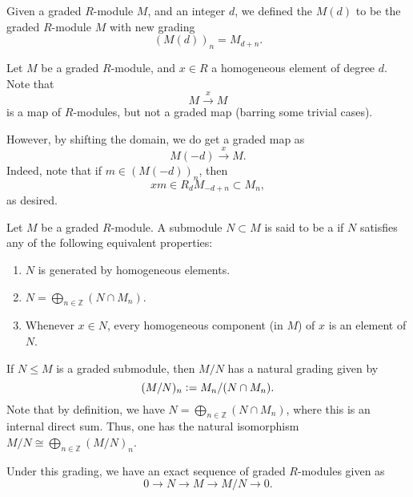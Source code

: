 \documentclass[12pt]{article}
\begin{document}
\begin{defn}
	Given a graded $R$-module $M$, and an integer $d$, we defined the  $M(d)$ to be the graded $R$-module $M$ with new grading
	\begin{equation*} 
		(M(d))_{n} = M_{d + n}.
	\end{equation*}
\end{defn}

\begin{obs}
	Let $M$ be a graded $R$-module, and $x \in R$ a homogeneous element of degree $d$. Note that 
	\begin{equation*} 
		M \xrightarrow{x} M
	\end{equation*}
	is a map of $R$-modules, but not a graded map (barring some trivial cases). 

	However, by shifting the domain, we do get a graded map as
	\begin{equation*} 
		M(-d) \xrightarrow{x} M.
	\end{equation*}
	Indeed, note that if $m \in (M(-d))_{n}$, then
	\begin{equation*} 
		xm \in R_{d}M_{-d + n} \subset M_{n},
	\end{equation*}
	as desired.
\end{obs}

\begin{defn}
	Let $M$ be a graded $R$-module. A submodule $N \subset M$ is said to be a  if $N$ satisfies any of the following equivalent properties:
	\begin{enumerate}
		\item $N$ is generated by homogeneous elements.
		\item $N = \bigoplus_{n \in \mathbb{Z}} (N \cap M_{n})$.
		\item Whenever $x \in N$, every homogeneous component (in $M$) of $x$ is an element of $N$.
	\end{enumerate}
\end{defn}

\begin{obs}
	If $N \le M$ is a graded submodule, then $M/N$ has a natural grading given by
	\begin{equation*} 
		(M/N)_{n} \vcentcolon= M_{n}/(N \cap M_{n}).
	\end{equation*}
	Note that by definition, we have $N = \bigoplus_{n \in \mathbb{Z}} (N \cap M_{n})$, where this is an internal direct sum. Thus, one has the natural isomorphism $M/N \cong \bigoplus_{n \in \mathbb{Z}} (M/N)_{n}$.

	Under this grading, we have an exact sequence of graded $R$-modules given as
	\begin{equation*} 
		0 \to N \to M \to M/N \to 0.
	\end{equation*}
\end{obs}
\end{document}
